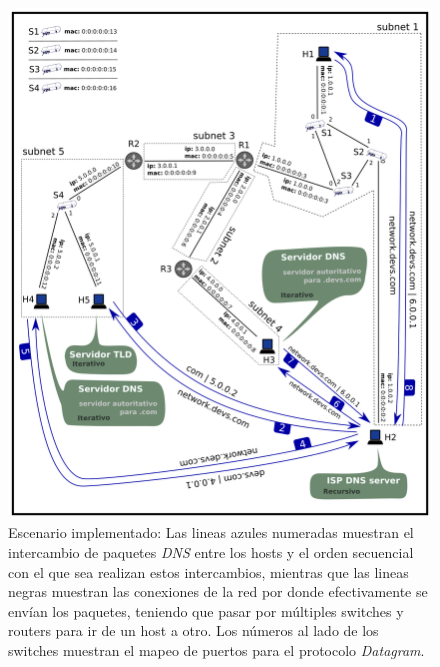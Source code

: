 \documentclass[10pt,a4paper]{article}
\begin{document}
\begin{figure}[!htb]
    \centering
    \includegraphics[width = 1.0\textwidth]{img/png/scenario.png}
    \caption{Escenario implementado: Las lineas azules numeradas muestran el intercambio de paquetes \textit{DNS} entre los hosts y el orden secuencial con el que sea realizan estos intercambios, mientras que las lineas negras muestran las conexiones de la red por donde efectivamente se envían los paquetes, teniendo que pasar por múltiples switches y routers para ir de un host a otro. Los números al lado de los switches muestran el mapeo de puertos para el protocolo \textit{Datagram}.}
    \label{figure: case study}
\end{figure}

\newpage
\end{document}
